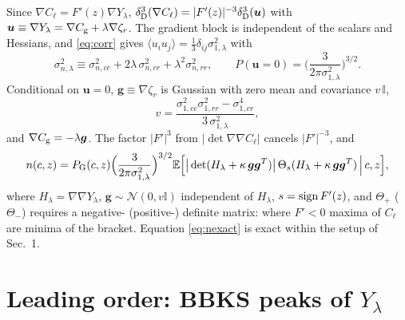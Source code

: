 \documentclass[11pt]{article}
\newcommand{\Cg}{C_{\rm g}}
\newcommand{\Cl}{C_{\ell}}
\newcommand{\zr}{\zeta_r}
\newcommand{\E}{\mathbb{E}}
\begin{document}
Since $\nabla\Cl=F'(z)\nabla Y_\lambda$, $\delta^3_{\rm D}(\nabla\Cl)=|F'(z)|^{-3}\delta^3_{\rm D}(\bm u)$
with $\bm u\equiv\nabla Y_\lambda=\nabla\Cg+\lambda\nabla\zr$. The gradient block is independent of
the scalars and Hessians, and \eqref{eq:corr} gives $\langle u_iu_j\rangle=\frac13\delta_{ij}\sigma^2_{1,\lambda}$ with
\begin{equation}
\sigma^2_{n,\lambda}\equiv\sigma^2_{n,cc}+2\lambda\,\sigma^2_{n,cr}+\lambda^2\sigma^2_{n,rr},
\qquad P(\bm u=0)=\Big(\frac{3}{2\pi\sigma^2_{1,\lambda}}\Big)^{3/2}.
\label{eq:siglam}
\end{equation}
Conditional on $\bm u=0$, $\bm g\equiv\nabla\zr$ is Gaussian with zero mean and covariance $v\,\mathbb{I}$,
\begin{equation}
v=\frac{\sigma^2_{1,cc}\sigma^2_{1,rr}-\sigma^4_{1,cr}}{3\,\sigma^2_{1,\lambda}} ,
\label{eq:v}
\end{equation}
and $\nabla\Cg=-\lambda\bm g$. The factor $|F'|^3$ from $|\det\nabla\nabla\Cl|$ cancels
$|F'|^{-3}$, and
\begin{equation}
n(c,z)=P_{\rm G}(c,z)\Big(\frac{3}{2\pi\sigma^2_{1,\lambda}}\Big)^{3/2}
\E\Big[\big|\det(H_\lambda+\kappa\,\bm g\bm g^T)\big|\,\Theta_s(H_\lambda+\kappa\,\bm g\bm g^T)\,\Big|\,c,z\Big],
\label{eq:nexact}
\end{equation}
where $H_\lambda=\nabla\nabla Y_\lambda$, $\bm g\sim\mathcal N(0,v\mathbb{I})$ independent of $H_\lambda$,
$s={\rm sign}\,F'(z)$, and $\Theta_{+}$ ($\Theta_{-}$) requires a negative- (positive-) definite
matrix: where $F'<0$ maxima of $\Cl$ are minima of the bracket. Equation \eqref{eq:nexact} is exact
within the setup of Sec.~1.

\section{Leading order: BBKS peaks of $Y_\lambda$}
\end{document}
